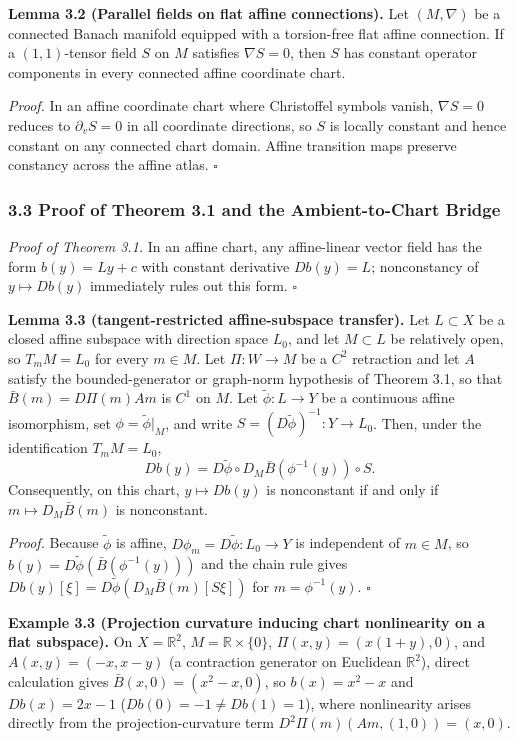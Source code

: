 \documentclass[
  11pt,
]{article}
\begin{document}
\textbf{Lemma 3.2 (Parallel fields on flat affine connections).} Let \((M, \nabla)\) be a connected Banach manifold equipped with a torsion-free flat affine connection. If a \((1,1)\)-tensor field \(S\) on \(M\) satisfies \(\nabla S = 0\), then \(S\) has constant operator components in every connected affine coordinate chart.

\emph{Proof.} In an affine coordinate chart where Christoffel symbols vanish, \(\nabla S = 0\) reduces to \(\partial_v S = 0\) in all coordinate directions, so \(S\) is locally constant and hence constant on any connected chart domain. Affine transition maps preserve constancy across the affine atlas. \(\square\)

\subsubsection{3.3 Proof of Theorem 3.1 and the Ambient-to-Chart Bridge}\label{proof-of-theorem-3.1-and-the-ambient-to-chart-bridge}

\emph{Proof of Theorem 3.1.} In an affine chart, any affine-linear vector field has the form \(b(y)=Ly+c\) with constant derivative \(Db(y)=L\); nonconstancy of \(y\mapsto Db(y)\) immediately rules out this form. \(\square\)

\textbf{Lemma 3.3 (tangent-restricted affine-subspace transfer).} Let \(L\subset X\) be a closed affine subspace with direction space \(L_0\), and let \(M\subset L\) be relatively open, so \(T_mM=L_0\) for every \(m\in M\). Let \(\Pi:W\to M\) be a \(C^2\) retraction and let \(A\) satisfy the bounded-generator or graph-norm hypothesis of Theorem 3.1, so that \(\bar B(m)=D\Pi(m)Am\) is \(C^1\) on \(M\). Let \(\tilde\phi:L\to Y\) be a continuous affine isomorphism, set \(\phi=\tilde\phi|_M\), and write \(S=(D\tilde\phi)^{-1}:Y\to L_0\). Then, under the identification \(T_mM=L_0\),
\[
Db(y) = D\tilde\phi \circ D_M\bar B(\phi^{-1}(y)) \circ S.
\]
Consequently, on this chart, \(y\mapsto Db(y)\) is nonconstant if and only if \(m\mapsto D_M\bar B(m)\) is nonconstant.

\emph{Proof.} Because \(\tilde\phi\) is affine, \(D\phi_m=D\tilde\phi:L_0\to Y\) is independent of \(m\in M\), so \(b(y)=D\tilde\phi(\bar B(\phi^{-1}(y)))\) and the chain rule gives \(Db(y)[\xi]=D\tilde\phi(D_M\bar B(m)[S\xi])\) for \(m=\phi^{-1}(y)\). \(\square\)

\textbf{Example 3.3 (Projection curvature inducing chart nonlinearity on a flat subspace).} On \(X=\mathbb R^2\), \(M=\mathbb R\times\{0\}\), \(\Pi(x,y)=(x(1+y),0)\), and \(A(x,y)=(-x,x-y)\) (a contraction generator on Euclidean \(\mathbb R^2\)), direct calculation gives \(\bar B(x,0)=(x^2-x,0)\), so \(b(x)=x^2-x\) and \(Db(x)=2x-1\) (\(Db(0)=-1\ne Db(1)=1\)), where nonlinearity arises directly from the projection-curvature term \(D^2\Pi(m)(Am,(1,0))=(x,0)\).
\end{document}
